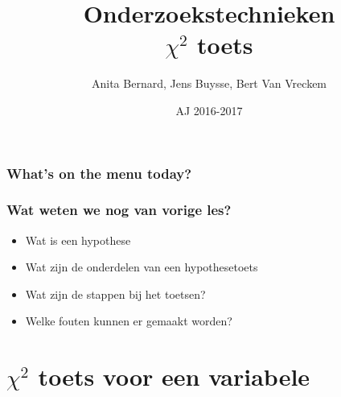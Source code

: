 \documentclass{beamer}
\title[Intro]{Onderzoekstechnieken\\$\chi^{2}$ toets}
\author{Anita Bernard, Jens Buysse, Bert {Van Vreckem}}
\date{AJ 2016-2017}
\begin{document}

\HoGentLogo

\titleframe





\begin{frame}
  \frametitle{What's on the menu today?}

  \tableofcontents
\end{frame}

\begin{frame}
  \frametitle{Wat weten we nog van vorige les?}

  \begin{itemize}
    \item Wat is een hypothese
    \item Wat zijn de onderdelen van een hypothesetoets
    \item Wat zijn de stappen bij het toetsen?
    \item Welke fouten kunnen er gemaakt worden?
  \end{itemize}
\end{frame}

\section{$\chi^{2}$ toets voor een variabele}
\sectionframelogo{}
\end{document}
